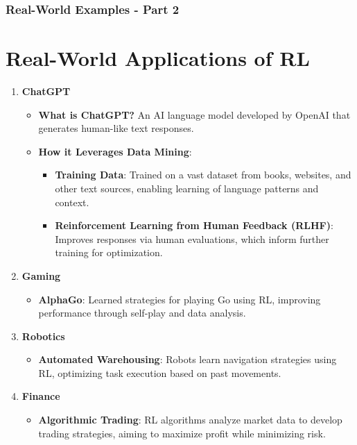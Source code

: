 \documentclass[aspectratio=169]{beamer}
\begin{document}
\begin{frame}[fragile]
    \frametitle{Real-World Examples - Part 2}
    \section*{Real-World Applications of RL}

    \begin{enumerate}
        \item \textbf{ChatGPT}
            \begin{itemize}
                \item \textbf{What is ChatGPT?} An AI language model developed by OpenAI that generates human-like text responses.
                \item \textbf{How it Leverages Data Mining}:
                    \begin{itemize}
                        \item \textbf{Training Data}: Trained on a vast dataset from books, websites, and other text sources, enabling learning of language patterns and context.
                        \item \textbf{Reinforcement Learning from Human Feedback (RLHF)}: Improves responses via human evaluations, which inform further training for optimization.
                    \end{itemize}
            \end{itemize}
            
        \item \textbf{Gaming}
            \begin{itemize}
                \item \textbf{AlphaGo}: Learned strategies for playing Go using RL, improving performance through self-play and data analysis.
            \end{itemize}
            
        \item \textbf{Robotics}
            \begin{itemize}
                \item \textbf{Automated Warehousing}: Robots learn navigation strategies using RL, optimizing task execution based on past movements.
            \end{itemize}
            
        \item \textbf{Finance}
            \begin{itemize}
                \item \textbf{Algorithmic Trading}: RL algorithms analyze market data to develop trading strategies, aiming to maximize profit while minimizing risk.
            \end{itemize}
    \end{enumerate}
\end{frame}
\end{document}
